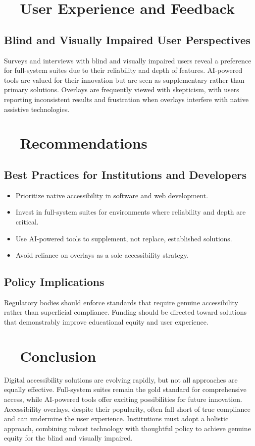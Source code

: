\section{~~User Experience and Feedback}
\subsection{Blind and Visually Impaired User Perspectives}
Surveys and interviews with blind and visually impaired users reveal a preference for full-system suites due to their reliability and depth of features\supercite{Doe2020, WebAIMSurvey}. AI-powered tools are valued for their innovation but are seen as supplementary rather than primary solutions. Overlays are frequently viewed with skepticism, with users reporting inconsistent results and frustration when overlays interfere with native assistive technologies.

\section{~~Recommendations}
\subsection{Best Practices for Institutions and Developers}
\begin{itemize}
	\item Prioritize native accessibility in software and web development\supercite{Thatcher2006, Henry2007}.
	\item Invest in full-system suites for environments where reliability and depth are critical.
	\item Use AI-powered tools to supplement, not replace, established solutions.
	\item Avoid reliance on overlays as a sole accessibility strategy\supercite{Brown2022}.
\end{itemize}

\subsection{Policy Implications}
Regulatory bodies should enforce standards that require genuine accessibility rather than superficial compliance\supercite{Jaeger2006}. Funding should be directed toward solutions that demonstrably improve educational equity and user experience\supercite{Lazar2015}.

\section{~~Conclusion}
Digital accessibility solutions are evolving rapidly, but not all approaches are equally effective. Full-system suites remain the gold standard for comprehensive access, while AI-powered tools offer exciting possibilities for future innovation. Accessibility overlays, despite their popularity, often fall short of true compliance and can undermine the user experience. Institutions must adopt a holistic approach, combining robust technology with thoughtful policy to achieve genuine equity for the blind and visually impaired\supercite{Burgstahler2015}.
